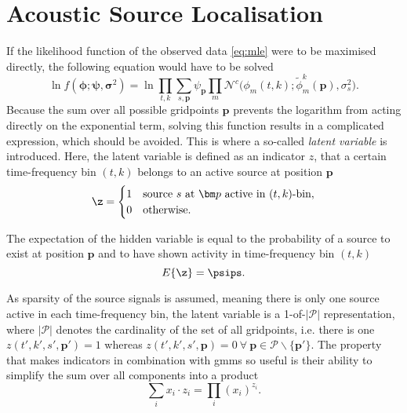 \section{Acoustic Source Localisation}
\label{sec:algLocEst}

If the likelihood function of the observed data \eqref{eq:mle} were to be maximised directly, the following equation would have to be solved
\begin{equation}
    \ln f(\bm\phi;\bm\psi,\bm\sigma^2) = \ln\prod_{t,k}\sum_{s,\bm p}\psi_{\bm p}\prod_m\mathcal{N}^c\big(\phi_m(t,k);\tilde\phi^k_m(\bm p),\sigma^2_{s}\big).
\end{equation}
Because the sum over all possible gridpoints $\bm p$ prevents the logarithm from acting directly on the exponential term, solving this function results in a complicated expression, which should be avoided. This is where a so-called \textit{latent variable} is introduced. Here, the latent variable is defined as an indicator $z$, that a certain time-frequency bin $(t,k)$ belongs to an active source at position $\bm p$ 
\begin{equation}
	\z=\begin{cases}
	    1& \text{source $s$ at $\bm p$ active in $(t,k)$-bin},\\
       0& \text{otherwise}.
	\end{cases}
\end{equation}

The expectation of the hidden variable is equal to the probability of a source to exist at position $\bm p$ and to have shown activity in time-frequency bin $(t, k)$ 
\begin{equation}
    E\{\z\}=\psips.
\end{equation}

As sparsity of the source signals is assumed, meaning there is only one source active in each time-frequency bin, the latent variable is a 1-of-$|\mathcal{P}|$ representation, where $|\mathcal{P}|$ denotes the cardinality of the set of all gridpoints, i.e. there is one $z(t',k',s',\bm p')=1$ whereas $z(t',k',s',\bm p)=0\ \forall\ \bm p\in\mathcal{P}\smallsetminus\{\bm p'\}$. The property that makes indicators in combination with \glspl{gmm} so useful is their ability to simplify the sum over all components into a product
\begin{equation}
\label{eq:indicator-sum-product}
    \sum_{i}x_i\cdot z_i=\prod_i (x_i)^{z_i}.
\end{equation}

